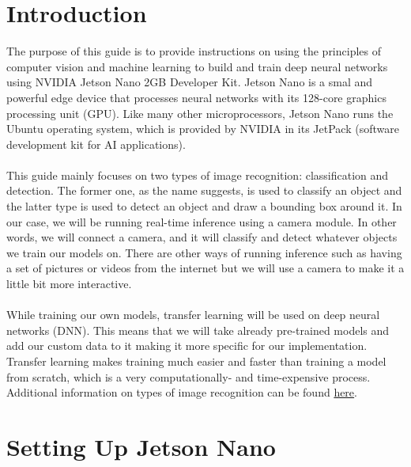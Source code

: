 \documentclass[letter, 12pt]{article}
\begin{document}
	\section{Introduction} \label{introduction}
	\noindent The purpose of this guide is to provide instructions on using the principles of computer vision and machine learning to build and train deep neural networks using NVIDIA Jetson Nano 2GB Developer Kit. Jetson Nano is a smal and powerful edge device that processes neural networks with its 128-core graphics processing unit (GPU). Like many other microprocessors, Jetson Nano runs the Ubuntu operating system, which is provided by NVIDIA in its JetPack (software development kit for AI applications). 
	\vspace{1ex} \\
	\vspace{1ex} \\
	This guide mainly focuses on two types of image recognition: classification and detection. The former one, as the name suggests, is used to classify an object and the latter type is used to detect an object and draw a bounding box around it. In our case, we will be running real-time inference using a camera module. In other words, we will connect a camera, and it will classify and detect whatever objects we train our models on. There are other ways of running inference such as having a set of pictures or videos from the internet but we will use a camera to make it a little bit more interactive.  
 	\vspace{1ex} \\
	\vspace{1ex} \\
	While training our own models, transfer learning will be used on deep neural networks (DNN). This means that we will take already pre-trained models and add our custom data to it making it more specific for our implementation. Transfer learning makes training much easier and faster than training a model from scratch, which is a very computationally- and time-expensive process. Additional information on types of image recognition can be found \href{https://github.com/dusty-nv/jetson-inference/#pre-trained-models}{here}.
	
	\section{Setting Up Jetson Nano}
\end{document}
